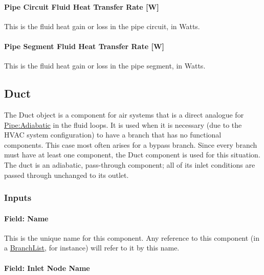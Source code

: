 \paragraph{Pipe Circuit Fluid Heat Transfer Rate {[}W{]}}\label{pipe-circuit-fluid-heat-transfer-rate-w}

This is the fluid heat gain or loss in the pipe circuit, in Watts.

\paragraph{Pipe Segment Fluid Heat Transfer Rate {[}W{]}}\label{pipe-segment-fluid-heat-transfer-rate-w}

This is the fluid heat gain or loss in the pipe segment, in Watts.

\subsection{Duct}\label{duct}

The Duct object is a component for air systems that is a direct analogue for \hyperref[pipeadiabatic]{Pipe:Adiabatic} in the fluid loops. It is used when it is necessary (due to the HVAC system configuration) to have a branch that has no functional components. This case most often arises for a bypass branch. Since every branch must have at least one component, the Duct component is used for this situation. The duct is an adiabatic, pass-through component; all of its inlet conditions are passed through unchanged to its outlet.

\subsubsection{Inputs}\label{inputs-12-009}

\paragraph{Field: Name}\label{field-name-12-006}

This is the unique name for this component. Any reference to this component (in a \hyperref[branchlist]{BranchList}, for instance) will refer to it by this name.

\paragraph{Field: Inlet Node Name}\label{field-inlet-node-name-2-000}

